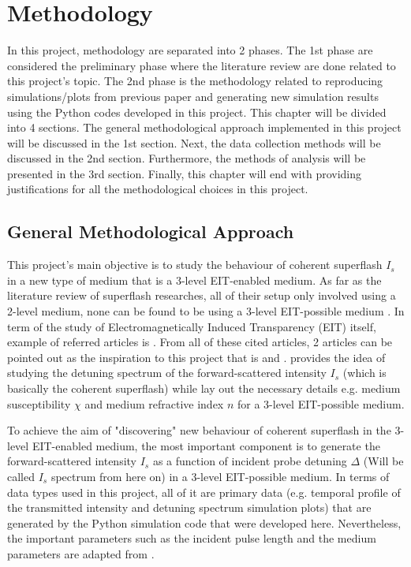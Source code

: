 \chapter{Methodology}
In this project, methodology are separated into 2 phases. The 1st phase are considered the preliminary phase where the literature review are done related to this project's topic. The 2nd phase is the methodology related to reproducing simulations/plots from previous paper and generating new simulation results using the Python codes developed in this project. This chapter will be divided into 4 sections. The general methodological approach implemented in this project will be discussed in the 1st section. Next, the data collection methods will be discussed in the 2nd section. Furthermore, the methods of analysis will be presented in the 3rd section. Finally, this chapter will end with providing justifications for all the methodological choices in this project.

\section{General Methodological Approach}
This project's main objective is to study the behaviour of coherent superflash $I_{s}$ in a new type of medium that is a 3-level EIT-enabled medium. As far as the literature review of superflash researches, all of their setup only involved using a 2-level medium, none can be found to be using a 3-level EIT-possible medium \cite{Kwong2014, Kwong2015, Kwong2017, Kwong2020}. In term of the study of Electromagnetically Induced Transparency (EIT) itself, example of referred articles is \cite{Gea-Banacloche1995, Braje2004}. From all of these cited articles, 2 articles can be pointed out as the inspiration to this project that is \cite{Kwong2014} and \cite{jeong2010slow}. \cite{Kwong2014} provides the idea of studying the detuning spectrum of the forward-scattered intensity $I_{s}$ (which is basically the coherent superflash) while \cite{jeong2010slow} lay out the necessary details e.g. medium susceptibility $\chi$ and medium refractive index $n$ for a 3-level EIT-possible medium.

\newpage

To achieve the aim of "discovering" new behaviour of coherent superflash in the 3-level EIT-enabled medium, the most important component is to generate the forward-scattered intensity $I_{s}$ as a function of incident probe detuning $\Delta$ (Will be called $I_{s}$ spectrum from here on) in a 3-level EIT-possible medium. In terms of data types used in this project, all of it are primary data (e.g. temporal profile of the transmitted intensity and detuning spectrum simulation plots) that are generated by the Python simulation code that were developed here. Nevertheless, the important parameters such as the incident pulse length and the medium parameters are adapted from \cite{jeong2010slow}.

